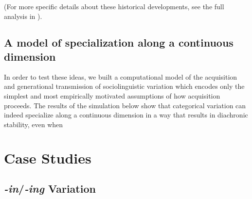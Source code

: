 (For more specific details about these historical developments, see the full analysis in ).

\subsection{A model of specialization along a continuous dimension}

In order to test these ideas, we built a computational model of the acquisition and generational transmission of sociolinguistic variation which encodes only the simplest and most empirically motivated assumptions of how acquisition proceeds. The results of the simulation below show that categorical variation can indeed specialize along a continuous dimension in a way that results in diachronic stability, even when %





\section{Case Studies}
\label{cases}

\subsection{\textsl{-in}/\textsl{-ing} Variation}

